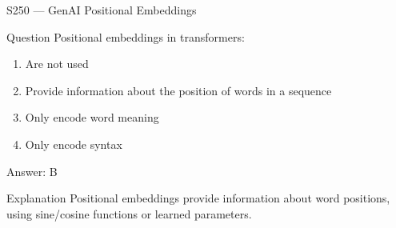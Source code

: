 \documentclass[aspectratio=169,8pt]{beamer}
\begin{document}
\begin{frame}{S250 --- GenAI Positional Embeddings}
	\begin{block}{Question}
		Positional embeddings in transformers:
		\begin{enumerate}
			\item Are not used
			\item Provide information about the position of words in a sequence
			\item Only encode word meaning
			\item Only encode syntax
		\end{enumerate}
	\end{block}
	\begin{exampleblock}{Answer: B}\end{exampleblock}
	\begin{block}{Explanation}
		Positional embeddings provide information about word positions, using sine/cosine functions or learned parameters.
	\end{block}
\end{frame}
\end{document}
